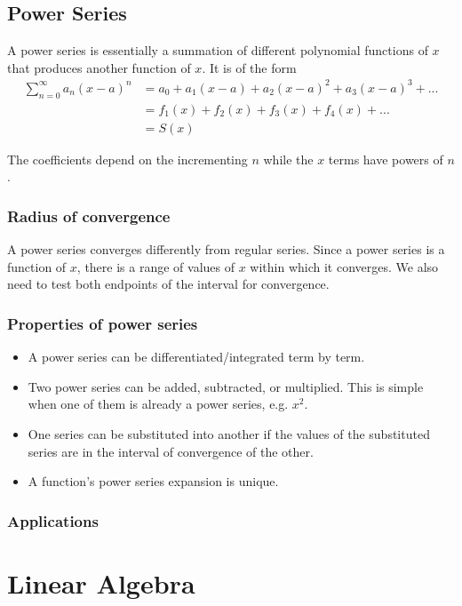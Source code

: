 \documentclass[11pt]{article}
\begin{document}
\subsection{Power Series}
A power series is essentially a summation of different polynomial functions of $x$ that produces another function of $x$. It is of the form
\begin{align}
\sum_{n=0}^{\infty} a_n(x-a)^n &= a_0 + a_1(x-a) + a_2(x-a)^2 + a_3(x-a)^3 + ... \\
                               &= f_1(x) + f_2(x) + f_3(x) + f_4(x) + ... \\
                               &= S(x)
\end{align}

The coefficients depend on the incrementing $n$ while the $x$ terms have powers of $n$.
\subsubsection{Radius of convergence}
A power series converges differently from regular series. Since a power series is a function of $x$, there is a range of values of $x$ within which it converges. We also need to test both endpoints of the interval for convergence.
\subsubsection{Properties of power series}
\begin{itemize}
\item A power series can be differentiated/integrated term by term.
\item Two power series can be added, subtracted, or multiplied. This is simple when one of them is already a power series, e.g. $x^2$.
\item One series can be substituted into another if the values of the substituted series are in the interval of convergence of the other.
\item A function's power series expansion is unique.
\end{itemize}
\subsubsection{Applications}
\section{Linear Algebra}
\end{document}
